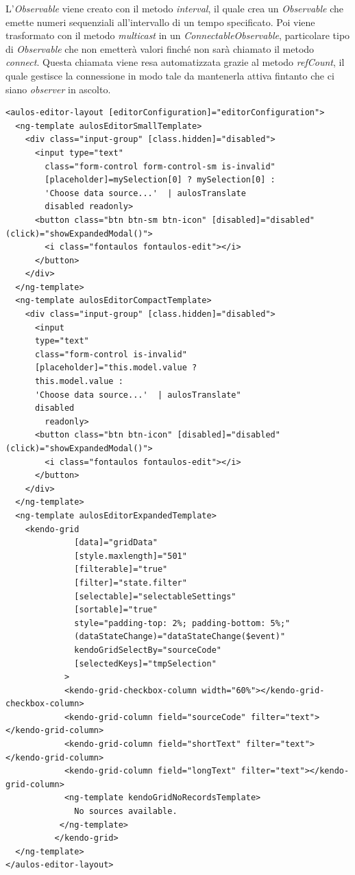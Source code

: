 L'\textit{Observable} viene creato con il metodo \textit{interval}, il quale crea un \textit{Observable} che emette numeri sequenziali all'intervallo di un tempo specificato. Poi viene trasformato con il metodo \textit{multicast} in un \textit{ConnectableObservable}, particolare tipo di \textit{Observable} che non emetterà valori finché non sarà chiamato il metodo \textit{connect}. Questa chiamata viene resa automatizzata grazie al metodo \textit{refCount}, il quale gestisce la connessione in modo tale da mantenerla attiva fintanto che ci siano \textit{observer} in ascolto.

\begin{lstlisting}[caption={source-editor.component.html}, style=html]
<aulos-editor-layout [editorConfiguration]="editorConfiguration">
  <ng-template aulosEditorSmallTemplate>
    <div class="input-group" [class.hidden]="disabled">
      <input type="text" 
        class="form-control form-control-sm is-invalid"
        [placeholder]=mySelection[0] ? mySelection[0] : 
        'Choose data source...'  | aulosTranslate 
        disabled readonly>
      <button class="btn btn-sm btn-icon" [disabled]="disabled" (click)="showExpandedModal()">
        <i class="fontaulos fontaulos-edit"></i>
      </button>
    </div>
  </ng-template>
  <ng-template aulosEditorCompactTemplate>
    <div class="input-group" [class.hidden]="disabled">
      <input 
      type="text" 
      class="form-control is-invalid" 
      [placeholder]="this.model.value ? 
      this.model.value : 
      'Choose data source...'  | aulosTranslate" 
      disabled
        readonly>
      <button class="btn btn-icon" [disabled]="disabled" (click)="showExpandedModal()">
        <i class="fontaulos fontaulos-edit"></i>
      </button>
    </div>
  </ng-template>
  <ng-template aulosEditorExpandedTemplate>
    <kendo-grid
              [data]="gridData"
              [style.maxlength]="501"
              [filterable]="true"
              [filter]="state.filter"
              [selectable]="selectableSettings"
              [sortable]="true"
              style="padding-top: 2%; padding-bottom: 5%;"
              (dataStateChange)="dataStateChange($event)"
              kendoGridSelectBy="sourceCode"
              [selectedKeys]="tmpSelection"
            >
            <kendo-grid-checkbox-column width="60%"></kendo-grid-checkbox-column>
            <kendo-grid-column field="sourceCode" filter="text"></kendo-grid-column>
            <kendo-grid-column field="shortText" filter="text"></kendo-grid-column>
            <kendo-grid-column field="longText" filter="text"></kendo-grid-column>
            <ng-template kendoGridNoRecordsTemplate>
              No sources available.
           </ng-template>
          </kendo-grid>
  </ng-template>
</aulos-editor-layout>
\end{lstlisting}
